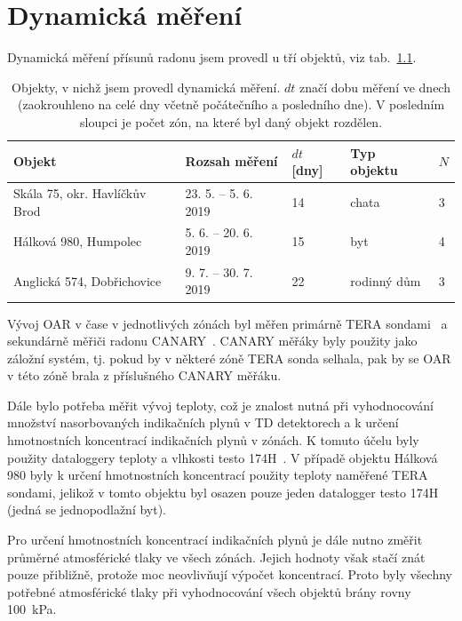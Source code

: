 \chapter{Dynamická měření}\label{navesti:dynamickaMereni}
Dynamická měření přísunů radonu jsem provedl u tří objektů, viz tab.~\ref{tab:dynMer_prehled}.
\begin{table}[ht]
	\centering
	\caption{Objekty, v nichž jsem provedl dynamická měření. $dt$ značí dobu měření ve dnech (zaokrouhleno na celé dny včetně počátečního a posledního dne). V posledním sloupci je počet zón, na které byl daný objekt rozdělen.}
	\label{tab:dynMer_prehled}
	\begin{tabular}{lllll}
		\toprule
		Objekt & Rozsah měření & $dt$ [dny] & Typ objektu &$N$\\
		\midrule
		Skála 75, okr. Havlíčkův Brod & 23. 5. -- 5. 6. 2019 & 14 & chata & 3\\
		Hálková 980, Humpolec & 5. 6. -- 20. 6. 2019 & 15 & byt & 4\\
		Anglická 574, Dobřichovice & 9. 7. -- 30. 7. 2019 & 22 & rodinný dům & 3\\
		\bottomrule
	\end{tabular}
\end{table}

Vývoj OAR v čase v jednotlivých zónách byl měřen primárně TERA sondami~\cite{tera} a sekundárně měřiči radonu CANARY~\cite{canary}. CANARY měřáky byly použity jako záložní systém, tj. pokud by v některé zóně  TERA sonda selhala, pak by se OAR v této zóně brala z příslušného CANARY měřáku. %

Dále bylo potřeba měřit vývoj teploty, což je znalost nutná při vyhodnocování množství nasorbovaných indikačních plynů v TD detektorech a k určení hmotnostních koncentrací indikačních plynů  v zónách. K tomuto účelu byly použity dataloggery teploty a vlhkosti testo 174H~\cite{testo}. V případě objektu Hálková 980 byly k určení hmotnostních koncentrací použity teploty naměřené TERA sondami, jelikož v tomto objektu byl osazen pouze jeden datalogger testo 174H (jedná se jednopodlažní byt). 

Pro určení hmotnostních koncentrací indikačních plynů je dále nutno změřit průměrné atmosférické tlaky ve všech zónách. Jejich hodnoty však stačí znát pouze přibližně, protože moc neovlivňují výpočet koncentrací. Proto byly všechny potřebné atmosférické tlaky při vyhodnocování všech objektů brány rovny \SI{100}{kPa}.

